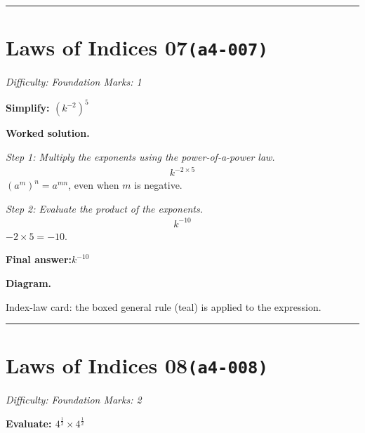 \documentclass[11pt]{article}
\newcommand{\question}[1]{\par\medskip\noindent\textbf{#1}\par}
\begin{document}
\medskip\hrule

\section*{Laws of Indices 07\quad\small\texttt{(a4-007)}}
\textit{Difficulty: Foundation \quad\textbar\quad Marks: 1}

\question{Simplify: \( (k^{-2})^5 \)}

\textbf{Worked solution.}

\textit{Step 1: Multiply the exponents using the power-of-a-power law.}
\[\begin{gathered}
k^{-2 \times 5}
\end{gathered}\]
\( (a^m)^n = a^{mn} \), even when \( m \) is negative.

\textit{Step 2: Evaluate the product of the exponents.}
\[\begin{gathered}
k^{-10}
\end{gathered}\]
\( -2 \times 5 = -10 \).

\begin{answerbox}
\textbf{Final answer:}\quad \(\displaystyle k^{-10}\)
\end{answerbox}
\textbf{Diagram.}

\begin{center}
\end{center}
\small Index-law card: the boxed general rule (teal) is applied to the expression.\normalsize

\medskip\hrule

\section*{Laws of Indices 08\quad\small\texttt{(a4-008)}}
\textit{Difficulty: Foundation \quad\textbar\quad Marks: 2}

\question{Evaluate: \( 4^{\frac{1}{2}} \times 4^{\frac{1}{2}} \)}
\end{document}
